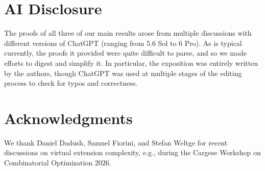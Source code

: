 \documentclass[centering,11pt,reqno]{amsart}
\theoremstyle{definition}
\begin{document}
\section*{AI Disclosure}
The proofs of all three of our main results arose from multiple discussions with different versions of ChatGPT (ranging from 5.6 Sol to 6 Pro). As is typical currently, the proofs it provided were quite difficult to parse, and so we made efforts to digest and simplify it. In particular, the exposition was entirely written by the authors, though ChatGPT was used at multiple stages of the editing process to check for typos and correctness.

\section*{Acknowledgments}
We thank Daniel Dadush, Samuel Fiorini, and Stefan Weltge for recent discussions on virtual extension complexity, e.g., during the Cargese Workshop on Combinatorial Optimization 2026.




\end{document}

